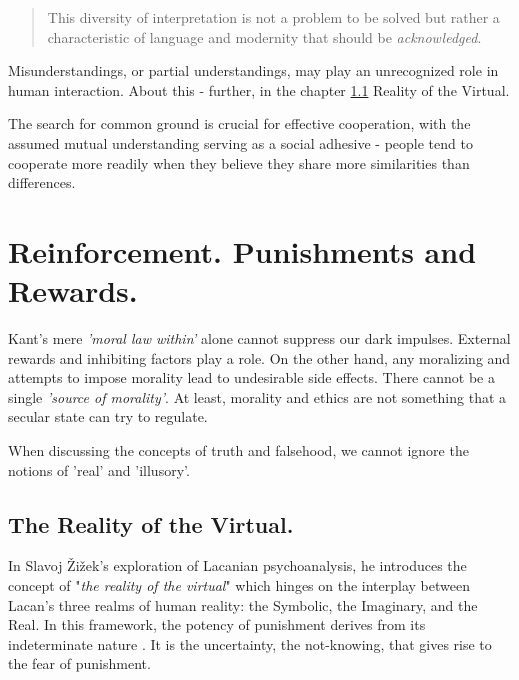 \documentclass[11pt,a4]{article}
\begin{document}
        \begin{quote}
            This diversity of interpretation is not a problem to be solved
            but rather a characteristic of language and modernity that
            should be \textit{acknowledged}.
        \end{quote}


        Misunderstandings, or partial understandings, may play an
        unrecognized role in human interaction.
        About this - further, in the chapter \ref{reality} Reality of the Virtual.

        The search for common ground is crucial for
        effective cooperation, with the assumed mutual understanding
        serving as a social adhesive - people tend to cooperate more readily
        when they believe they share more similarities than differences.









\newpage
\section{Reinforcement. Punishments and Rewards.}

Kant's mere \textit{'moral law within'} alone cannot suppress our
dark impulses. External rewards and inhibiting factors play a role.
On the other hand,  any moralizing and attempts to impose morality
lead to undesirable side effects. There cannot be
a single \textit{'source of morality'}.
At least, morality and ethics are not something that a
secular state can try to regulate.

When discussing the concepts of truth and falsehood, we cannot
ignore the notions of 'real' and 'illusory'.


    \subsection{The Reality of the Virtual.} \label{reality}

        In Slavoj Žižek's exploration of Lacanian psychoanalysis, he introduces
        the concept of "\textit{the reality of the virtual}" which hinges on the interplay between
        Lacan's three realms of human reality: the Symbolic, the Imaginary, and the Real.
        In this framework, the potency of punishment derives from its indeterminate
        nature \cite{Borretzen2012-tx}. It is the uncertainty, the not-knowing, that gives rise
        to the fear of punishment.
\end{document}
